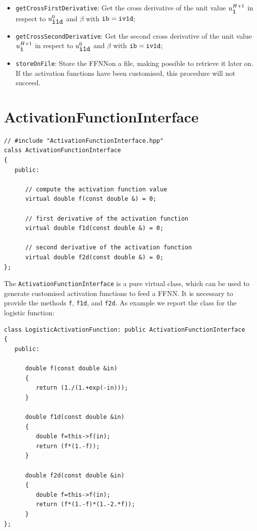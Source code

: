\documentclass[11pt,a4paper,twoside]{article}
\begin{document}
\begin{itemize}
\item \verb+getCrossFirstDerivative+: Get the cross derivative of the unit value $u^{H+1}_{\verb+i+}$ in respect to $u^0_{\verb+i1d+}$ and $\beta$ with $\verb+ib+ = \verb+iv1d+$;
\item \verb+getCrossSecondDerivative+: Get the second cross derivative of the unit value $u^{H+1}_{\verb+i+}$ in respect to $u^0_{\verb+i1d+}$ and $\beta$ with $\verb+ib+ = \verb+iv1d+$;
\item \verb+storeOnFile+: Store the FFNNon a file, making possible to retrieve it later on. If the activation functions have been customised, this procedure will not succeed.
\end{itemize}




\section{ActivationFunctionInterface} %
\label{sec:activationfunctioninterface}

\begin{verbatim}
// #include "ActivationFunctionInterface.hpp"
calss ActivationFunctionInterface
{
   public:

      // compute the activation function value
      virtual double f(const double &) = 0;

      // first derivative of the activation function
      virtual double f1d(const double &) = 0;

      // second derivative of the activation function
      virtual double f2d(const double &) = 0;
};
\end{verbatim}

The \verb+ActivationFunctionInterface+ is a pure virtual class, which can be used to generate customised activation functions to feed a FFNN.
It is necessary to provide the methods \verb+f+, \verb+f1d+, and \verb+f2d+.
As example we report the class for the logistic function:

\begin{verbatim}
class LogisticActivationFunction: public ActivationFunctionInterface
{
   public:

      double f(const double &in)
      {
         return (1./(1.+exp(-in)));
      }

      double f1d(const double &in)
      {
         double f=this->f(in);
         return (f*(1.-f));
      }

      double f2d(const double &in)
      {
         double f=this->f(in);
         return (f*(1.-f)*(1.-2.*f));
      }
};

\end{verbatim}






\printindex
\end{document}

